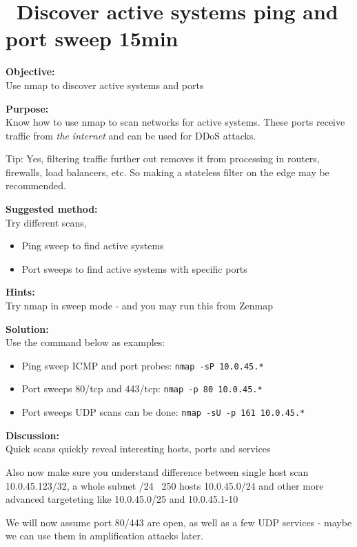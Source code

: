 \documentclass[a4paper,11pt,notitlepage]{report}
\begin{document}
\chapter{\faExclamationTriangle\ Discover active systems ping and port sweep 15min}
\label{ex:nmap-pingsweep}

{\bf Objective:}\\
Use nmap to discover active systems and ports

{\bf Purpose:}\\
Know how to use nmap to scan networks for active systems. These ports receive traffic from \emph{the internet} and can be used for DDoS attacks.

Tip: Yes, filtering traffic further out removes it from processing in routers, firewalls, load balancers, etc. So making a stateless filter on the edge may be recommended.

{\bf Suggested method:}\\
Try different scans,
\begin{itemize}
\item Ping sweep to find active systems
\item Port sweeps to find active systems with specific ports
\end{itemize}

{\bf Hints:} \\
Try nmap in sweep mode - and you may run this from Zenmap

{\bf Solution:}\\
Use the command below as examples:
\begin{itemize}
\item Ping sweep ICMP and port probes: \verb+nmap -sP 10.0.45.*+
\item Port sweeps 80/tcp and 443/tcp: \verb+nmap -p 80 10.0.45.*+
\item Port sweeps UDP scans can be done: \verb+nmap -sU -p 161 10.0.45.*+
\end{itemize}

{\bf Discussion:}\\
Quick scans quickly reveal interesting hosts, ports and services

Also now make sure you understand difference between single host scan
10.0.45.123/32, a whole subnet /24 ~250 hosts 10.0.45.0/24 and other more advanced targeteting like 10.0.45.0/25 and 10.0.45.1-10

We will now assume port 80/443 are open, as well as a few UDP services - maybe we can use them in amplification attacks later.
\end{document}
